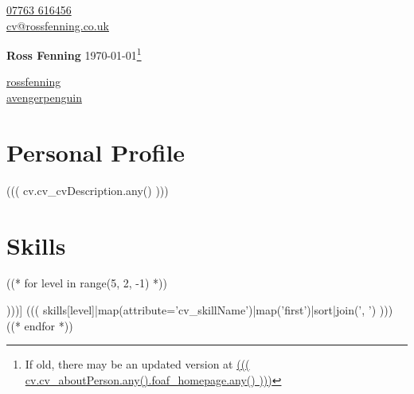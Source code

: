 \documentclass[10pt]{article}
\begin{document}
\begin{multicols}{3}
  \begin{flushleft}
    {\color{icnclr}} \href{tel:+447763616456}{07763 616456} \\
    {\color{icnclr}\faEnvelope[regular]} \href{mailto:cv@rossfenning.co.uk}{cv@rossfenning.co.uk} \\
  \end{flushleft}

\columnbreak

  \begin{center}
      {\huge\bfseries Ross Fenning}
      \today\footnote{If old, there may be an updated version at \href{((( cv.cv_aboutPerson.any().foaf_homepage.any() )))}{((( cv.cv_aboutPerson.any().foaf_homepage.any() )))}}
 \end{center}

\columnbreak

  \begin{flushright}
    \href{https://www.linkedin.com/in/rossfenning/}{rossfenning} {\color{icnclr}\faLinkedinIn} \\
    \href{https://github.com/avengerpenguin}{avengerpenguin} {\color{icnclr}\faGithub} \\
  \end{flushright}
\end{multicols}



\section*{Personal Profile}
((( cv.cv_cvDescription.any() )))

\section*{Skills}

\begin{description}
((* for level in range(5, 2, -1) *))
\item[((( skill_levels[level] )))] ((( skills[level]|map(attribute='cv_skillName')|map('first')|sort|join(', ') )))
((* endfor *))
\end{description}
\end{document}
